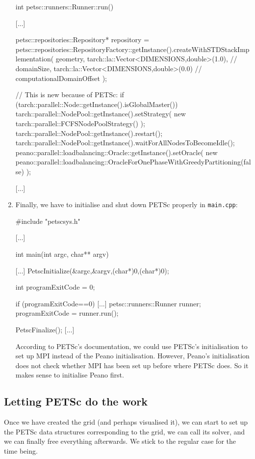 \begin{enumerate}
\begin{code}
int petsc::runners::Runner::run() {

  [...]

  petsc::repositories::Repository* repository = 
    petsc::repositories::RepositoryFactory::getInstance().createWithSTDStackImplementation(
      geometry,
      tarch::la::Vector<DIMENSIONS,double>(1.0),   // domainSize,
      tarch::la::Vector<DIMENSIONS,double>(0.0)    // computationalDomainOffset
    );
  

  // This is new because of PETSc:
  if (tarch::parallel::Node::getInstance().isGlobalMaster()) {
    tarch::parallel::NodePool::getInstance().setStrategy(
      new tarch::parallel::FCFSNodePoolStrategy()
    );
  }
  tarch::parallel::NodePool::getInstance().restart();
  tarch::parallel::NodePool::getInstance().waitForAllNodesToBecomeIdle();
  peano::parallel::loadbalancing::Oracle::getInstance().setOracle(
    new peano::parallel::loadbalancing::OracleForOnePhaseWithGreedyPartitioning(false)
  );

  [...]
}
  \end{code}
  \item Finally, we have to initialise and shut down PETSc properly in
  \texttt{main.cpp}:
  \begin{code}
#include "petscsys.h"

[...]

int main(int argc, char** argv) {
  [...]
  PetscInitialize(&argc,&argv,(char*)0,(char*)0);

  int programExitCode = 0;

  if (programExitCode==0) {
    [...]
    petsc::runners::Runner runner;
    programExitCode = runner.run();
  }

  PetscFinalize();
  [...]
}  
  \end{code}
  According to PETSc's documentation, we could use PETSc's initialisation to set
  up MPI instead of the Peano initialisation. However, Peano's initialisation
  does not check whether MPI has been set up before where PETSc does. So it
  makes sense to initialise Peano first.
\end{enumerate}




\subsection{Letting PETSc do the work}

Once we have created the grid (and perhaps visualised it), we can start to set
up the PETSc data structures corresponding to the grid, we can call its solver,
and we can finally free everything afterwards.
We stick to the regular case for the time being.

